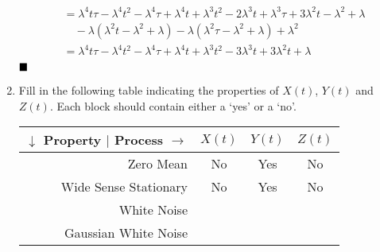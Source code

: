 \begin{enumerate}
\begin{align*}
           & = \lambda^4 t \tau - \lambda^4 t^2 - \lambda^4 \tau + \lambda^4 t
             + \lambda^3 t^2 - 2 \lambda^3 t + \lambda^3 \tau + 3 \lambda^2 t - \lambda^2 + \lambda \\
           & \quad - \lambda (\lambda^2 t - \lambda^2 + \lambda) - \lambda (\lambda^2 \tau - \lambda^2 + \lambda) +\lambda^2\\
           & = \lambda^4 t \tau - \lambda^4 t^2 - \lambda^4 \tau + \lambda^4 t
             + \lambda^3 t^2 - 3 \lambda^3 t + 3 \lambda^2 t + \lambda \\
    \end{align*} $\hfill\blacksquare$
  \item Fill in the following table indicating the properties of $X(t)$, $Y(t)$ and $Z(t)$. Each block should contain either a `yes' or a `no'.

    \begin{tabular}{|r||c|c|c|}\hline
      $\downarrow$ Property $|$ Process $\rightarrow$                     & $X(t)$    &  $Y(t)$   & $Z(t)$    \\ \hline
      Zero Mean                                                           & No        &  Yes      & No        \\ \hline
      Wide Sense Stationary                                               & No        &  Yes      & No        \\ \hline
      White Noise                                                         &           &           &           \\ \hline
      Gaussian White Noise                                                &           &           &           \\ \hline
    \end{tabular}
  \end{enumerate}





